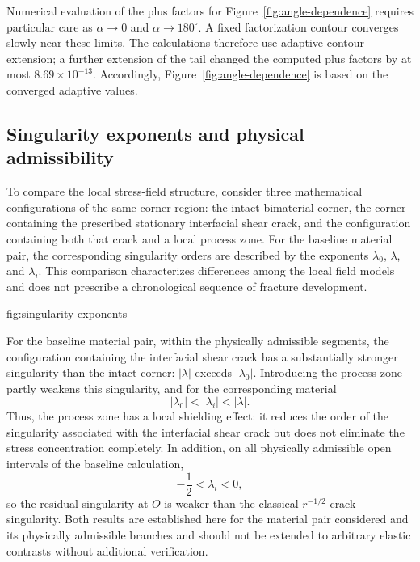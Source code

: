 Numerical evaluation of the plus factors for
Figure~\ref{fig:angle-dependence} requires particular care as
$\alpha\to0$ and $\alpha\to180^\circ$. A fixed factorization contour
converges slowly near these limits. The calculations therefore use
adaptive contour extension; a further extension of the tail changed the
computed plus factors by at most $8.69\times10^{-13}$. Accordingly,
Figure~\ref{fig:angle-dependence} is based on the converged adaptive
values.

\subsection{Singularity exponents and physical admissibility}
\label{subsec:figure4}

To compare the local stress-field structure, consider three mathematical
configurations of the same corner region: the intact bimaterial corner,
the corner containing the prescribed stationary interfacial shear crack,
and the configuration containing both that crack and a local process zone.
For the baseline material pair, the corresponding singularity orders are
described by the exponents $\lambda_0$, $\lambda$, and $\lambda_i$.
This comparison characterizes differences among the local field models
and does not prescribe a chronological sequence of fracture development.

%
{fig:singularity-exponents}

For the baseline material pair, within the physically admissible segments,
the configuration containing the interfacial shear crack has a substantially
stronger singularity than the intact corner:
$|\lambda|$ exceeds $|\lambda_0|$. Introducing the process zone partly weakens this singularity, and for the
corresponding material
\begin{equation*}
  |\lambda_0|<|\lambda_i|<|\lambda|.
\end{equation*}
Thus, the process zone has a local shielding effect: it reduces the
order of the singularity associated with the interfacial shear crack but
does not eliminate the stress concentration completely. In addition, on
all physically admissible open intervals of the baseline calculation,
\begin{equation*}
  -\frac12<\lambda_i<0,
\end{equation*}
so the residual singularity at $O$ is weaker than the classical
$r^{-1/2}$ crack singularity. Both results are established here for
the material pair considered and its physically admissible branches and
should not be extended to arbitrary elastic contrasts without additional
verification.

